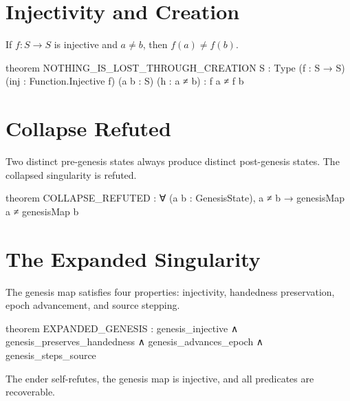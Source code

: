 \section{Injectivity and Creation}

\begin{theorem}\label{thm:injective}
If $f : S \to S$ is injective and $a \neq b$, then $f(a) \neq f(b)$.
\end{theorem}

\begin{leancode}
theorem NOTHING_IS_LOST_THROUGH_CREATION {S : Type}
    (f : S → S) (inj : Function.Injective f)
    (a b : S) (h : a ≠ b) : f a ≠ f b
\end{leancode}

\section{Collapse Refuted}

\begin{theorem}\label{thm:collapse}
Two distinct pre-genesis states always produce distinct post-genesis states. The collapsed singularity is refuted.
\end{theorem}

\begin{leancode}
theorem COLLAPSE_REFUTED :
    ∀ (a b : GenesisState),
        a ≠ b → genesisMap a ≠ genesisMap b
\end{leancode}

\section{The Expanded Singularity}

\begin{theorem}\label{thm:expanded}
The genesis map satisfies four properties: injectivity, handedness preservation, epoch advancement, and source stepping.
\end{theorem}

\begin{leancode}
theorem EXPANDED_GENESIS :
    genesis_injective ∧ genesis_preserves_handedness ∧
    genesis_advances_epoch ∧ genesis_steps_source
\end{leancode}

\begin{theorem}\label{thm:g-expanded}
The ender self-refutes, the genesis map is injective, and all predicates are recoverable.
\end{theorem}


